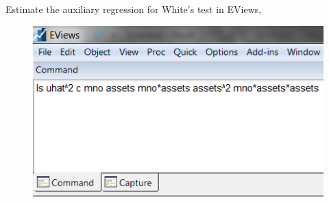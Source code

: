 \documentclass[12pt]{report}
\begin{document}
\noindent Estimate the auxiliary regression for White's test in EViews,
\begin{figure}[H]
	\centering
	\includegraphics{tute9_3}
\end{figure}
\vspace{-\baselineskip}
\end{document}
